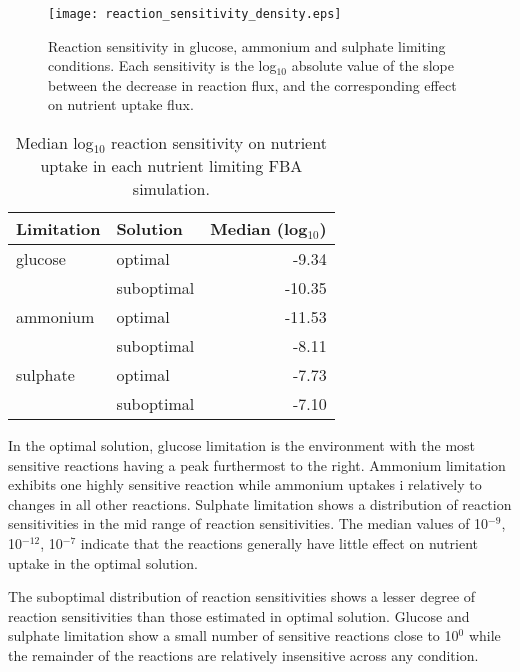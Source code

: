 \begin{figure}%
  \centering
  \texttt{[image: reaction\_sensitivity\_density.eps]}
  \caption[Reaction sensitivity in glucose, ammonium and sulphate limitation]{Reaction sensitivity in glucose, ammonium and sulphate limiting conditions. Each sensitivity is the log$_10$ absolute value of the slope between the decrease in reaction flux, and the corresponding effect on nutrient uptake flux. }
  \label{figure:sensitivity_density}
\end{figure}%

\begin{table}%
  \centering
  \begin{tabular}{l l r}
                                                    \toprule
    Limitation  & Solution   & Median (log$_10$) \\ \midrule
    glucose     & optimal    &  -9.34            \\
                & suboptimal & -10.35            \\
    ammonium    & optimal    & -11.53            \\
                & suboptimal &  -8.11            \\
    sulphate    & optimal    &  -7.73            \\
                & suboptimal &  -7.10            \\ \bottomrule
  \end{tabular}
  \caption[Median log$_10$ reaction sensitivities]{Median log$_10$ reaction sensitivity on nutrient uptake in each nutrient limiting FBA simulation. }
  \label{table:median_sensitivity}
\end{table}%

In the optimal solution, glucose limitation is the environment with the most sensitive reactions having a peak furthermost to the right. Ammonium limitation exhibits one highly sensitive reaction while ammonium uptakes i relatively to changes in all other reactions. Sulphate limitation shows a distribution of reaction sensitivities in the mid range of reaction sensitivities. The median values of 10$^{-9}$, 10$^{-12}$, 10$^{-7}$ indicate that the reactions generally have little effect on nutrient uptake in the optimal solution.

The suboptimal distribution of reaction sensitivities shows a lesser degree of reaction sensitivities than those estimated in optimal solution. Glucose and sulphate limitation show a small number of sensitive reactions close to 10$^0$ while the remainder of the reactions are relatively insensitive across any condition.


